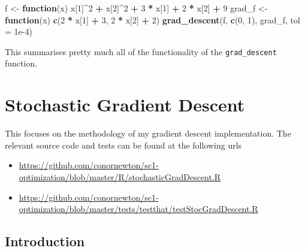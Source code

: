 \documentclass[12pt,]{article}
\newenvironment{Shaded}{\begin{snugshade}}{\end{snugshade}}
\newcommand{\ControlFlowTok}[1]{\textcolor[rgb]{0.13,0.29,0.53}{\textbf{#1}}}
\newcommand{\DataTypeTok}[1]{\textcolor[rgb]{0.13,0.29,0.53}{#1}}
\newcommand{\DecValTok}[1]{\textcolor[rgb]{0.00,0.00,0.81}{#1}}
\newcommand{\FloatTok}[1]{\textcolor[rgb]{0.00,0.00,0.81}{#1}}
\newcommand{\KeywordTok}[1]{\textcolor[rgb]{0.13,0.29,0.53}{\textbf{#1}}}
\newcommand{\NormalTok}[1]{#1}
\newcommand{\OperatorTok}[1]{\textcolor[rgb]{0.81,0.36,0.00}{\textbf{#1}}}
\newcommand{\StringTok}[1]{\textcolor[rgb]{0.31,0.60,0.02}{#1}}
\providecommand{\tightlist}{%
  \setlength{\itemsep}{0pt}\setlength{\parskip}{0pt}}
\begin{document}
\begin{Shaded}
\begin{Highlighting}[]
\NormalTok{    f <-}\StringTok{ }\ControlFlowTok{function}\NormalTok{(x) x[}\DecValTok{1}\NormalTok{]}\OperatorTok{^}\DecValTok{2} \OperatorTok{+}\StringTok{ }\NormalTok{x[}\DecValTok{2}\NormalTok{]}\OperatorTok{^}\DecValTok{2} \OperatorTok{+}\StringTok{ }\DecValTok{3} \OperatorTok{*}\StringTok{ }\NormalTok{x[}\DecValTok{1}\NormalTok{] }\OperatorTok{+}\StringTok{ }\DecValTok{2} \OperatorTok{*}\StringTok{ }\NormalTok{x[}\DecValTok{2}\NormalTok{] }\OperatorTok{+}\StringTok{ }\DecValTok{9}
\NormalTok{    grad_f <-}\StringTok{ }\ControlFlowTok{function}\NormalTok{(x) }\KeywordTok{c}\NormalTok{(}\DecValTok{2} \OperatorTok{*}\StringTok{ }\NormalTok{x[}\DecValTok{1}\NormalTok{] }\OperatorTok{+}\StringTok{ }\DecValTok{3}\NormalTok{, }\DecValTok{2} \OperatorTok{*}\StringTok{ }\NormalTok{x[}\DecValTok{2}\NormalTok{] }\OperatorTok{+}\StringTok{ }\DecValTok{2}\NormalTok{)}
    \KeywordTok{grad_descent}\NormalTok{(f, }\KeywordTok{c}\NormalTok{(}\DecValTok{0}\NormalTok{, }\DecValTok{1}\NormalTok{), grad_f, }\DataTypeTok{tol =} \FloatTok{1e-4}\NormalTok{)}
\end{Highlighting}
\end{Shaded}

This summarises pretty much all of the functionality of the
\texttt{grad\_descent} function. \newpage

\hypertarget{stochastic-gradient-descent}{%
\section{Stochastic Gradient
Descent}\label{stochastic-gradient-descent}}

This focuses on the methodology of my gradient descent implementation.
The relevant source code and tests can be found at the following urls

\begin{itemize}
\tightlist
\item
  \url{https://github.com/conornewton/sc1-optimization/blob/master/R/stochasticGradDescent.R}
\item
  \url{https://github.com/conornewton/sc1-optimization/blob/master/tests/testthat/testStocGradDescent.R}
\end{itemize}

\hypertarget{introduction-1}{%
\subsection{Introduction}\label{introduction-1}}
\end{document}
